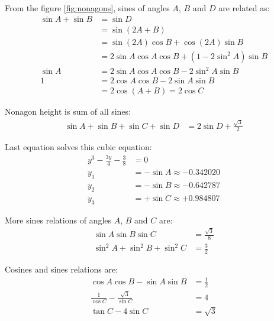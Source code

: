 \documentclass[11pt]{article}
\begin{document}
From the figure \ref{fig:nonagons}, sines of angles $A$, $B$ and $D$ are related as:
\begin{align}
\sin{A} + \sin{B} &= \sin{D} \\
 &= \sin(2A + B) \nonumber\\
 &= \sin(2A)\cos{B} + \cos(2A)\sin{B} \nonumber\\
 &= 2\sin{A}\cos{A}\cos{B} + (1-2\sin^2{A})\sin{B} \nonumber\\
\sin{A} &= 2\sin{A}\cos{A}\cos{B} -2\sin^2{A}\sin{B} \nonumber\\
1 &= 2\cos{A}\cos{B} -2\sin{A}\sin{B} \\
  &= 2\cos(A+B) = 2\cos{C} \nonumber
\end{align}

Nonagon height is sum of all sines:
\begin{align}
\sin{A}+\sin{B}+\sin{C}+\sin{D} &= 2\sin{D} + \frac{\sqrt{3}}{2}
\end{align}



Last equation solves this cubic equation:
\begin{align*}
y^3 - \frac{3y}{4} - \frac{3}{8} &= 0\\
y_1 &= -\sin{A} \approx -0.342020\\
y_2 &= -\sin{B} \approx -0.642787\\
y_3 &= +\sin{C} \approx +0.984807
\end{align*}

More sines relations of angles $A$, $B$ and $C$ are:
\begin{align*}
\sin{A}\sin{B}\sin{C} &= \frac{\sqrt{3}}{8}\\
\sin^2{A} + \sin^2{B} + \sin^2{C} &= \frac{3}{2}
\end{align*}

Cosines and sines relations are:
\begin{align*}
\cos{A}\cos{B} - \sin{A}\sin{B} &= \frac{1}{2}\\
\frac{1}{\cos{C}} -\frac{\sqrt{3}}{\sin{C}} &= 4\\
\tan{C} - 4\sin{C} &= \sqrt{3}
\end{align*}
\end{document}
